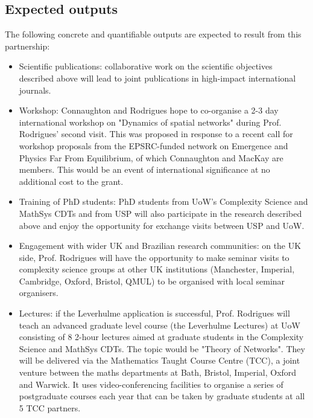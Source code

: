 \subsection{Expected outputs}
The following concrete and quantifiable outputs are expected to result from 
this partnership:
\begin{itemize}
\itemsep\myitemsep
\item Scientific publications: collaborative work on the scientific objectives 
described above will lead to joint publications in high-impact international 
journals.
\item Workshop: Connaughton and Rodrigues hope to co-organise a 2-3 day 
international workshop on "Dynamics of spatial networks" during 
Prof. Rodrigues' second visit. This was proposed in response to a recent 
call for workshop proposals from the EPSRC-funded network on Emergence and Physics 
Far From Equilibrium, of which Connaughton and MacKay are members. This 
would be an event of international significance at no 
additional cost to the grant.
\item Training of PhD students: PhD students from UoW's Complexity 
Science and MathSys CDTs and from USP will also participate in the research 
described above and enjoy the opportunity for exchange visits between USP 
and UoW.
\item Engagement with wider UK and Brazilian research communities: on the UK 
side, Prof. Rodrigues will have the opportunity to make seminar visits to 
complexity science groups at other UK institutions (Manchester, Imperial, 
Cambridge, Oxford, Bristol, QMUL)  to be organised with local seminar 
organisers.
\item Lectures:  if the Leverhulme application is successful, Prof. Rodrigues 
will teach an advanced graduate level course (the Leverhulme Lectures) at UoW 
consisting of 8 2-hour lectures aimed at graduate students in the Complexity 
Science and MathSys CDTs. The topic would be "Theory of Networks". They will be 
delivered via the Mathematics Taught Course Centre (TCC), a joint venture 
between the maths departments at Bath, Bristol, Imperial, Oxford and Warwick. 
It uses video-conferencing facilities to organise a series of postgraduate 
courses each year that can be taken by graduate students at all 5 TCC partners.
\end{itemize}

